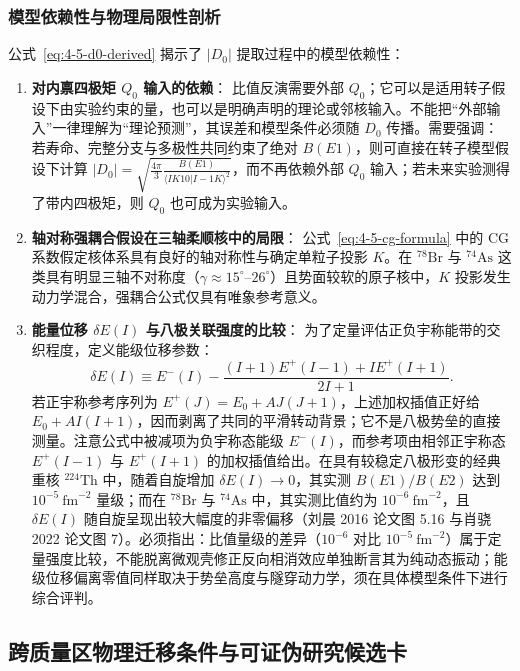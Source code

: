 \subsubsection{模型依赖性与物理局限性剖析}

公式~\eqref{eq:4-5-d0-derived} 揭示了 $|D_0|$ 提取过程中的模型依赖性：
\begin{enumerate}
\item \textbf{对内禀四极矩 $Q_0$ 输入的依赖}：
比值反演需要外部 $Q_0$；它可以是适用转子假设下由实验约束的量，也可以是明确声明的理论或邻核输入。不能把“外部输入”一律理解为“理论预测”，其误差和模型条件必须随 $D_0$ 传播。需要强调：若寿命、完整分支与多极性共同约束了绝对 $B(E1)$，则可直接在转子模型假设下计算 $|D_0| = \sqrt{\frac{4\pi}{3} \frac{B(E1)}{\langle I K 1 0 | I-1 K \rangle^2}}$，而不再依赖外部 $Q_0$ 输入；若未来实验测得了带内四极矩，则 $Q_0$ 也可成为实验输入。
\item \textbf{轴对称强耦合假设在三轴柔顺核中的局限}：
公式~\eqref{eq:4-5-cg-formula} 中的 CG 系数假定核体系具有良好的轴对称性与确定单粒子投影 $K$。在 $^{78}\mathrm{Br}$ 与 $^{74}\mathrm{As}$ 这类具有明显三轴不对称度（$\gamma \approx 15^\circ$--$26^\circ$）且势面较软的原子核中，$K$ 投影发生动力学混合，强耦合公式仅具有唯象参考意义。
\item \textbf{能量位移 $\delta E(I)$ 与八极关联强度的比较}：
为了定量评估正负宇称能带的交织程度，定义能级位移参数：
\begin{equation}\label{eq:4-5-delta-e-def}
\delta E(I) \equiv E^-(I) - \frac{(I+1) E^+(I-1) + I E^+(I+1)}{2I + 1}.
\end{equation}
若正宇称参考序列为 $E^+(J)=E_0+A J(J+1)$，上述加权插值正好给 $E_0+A I(I+1)$，因而剥离了共同的平滑转动背景；它不是八极势垒的直接测量。注意公式中被减项为负宇称态能级 $E^-(I)$，而参考项由相邻正宇称态 $E^+(I-1)$ 与 $E^+(I+1)$ 的加权插值给出。在具有较稳定八极形变的经典重核 $^{224}\mathrm{Th}$ 中，随着自旋增加 $\delta E(I) \to 0$，其实测 $B(E1)/B(E2)$ 达到 $10^{-5}\ \mathrm{fm}^{-2}$ 量级；而在 $^{78}\mathrm{Br}$ 与 $^{74}\mathrm{As}$ 中，其实测比值约为 $10^{-6}\ \mathrm{fm}^{-2}$，且 $\delta E(I)$ 随自旋呈现出较大幅度的非零偏移（刘晨 2016 论文图 5.16 与肖骁 2022 论文图 7）。必须指出：比值量级的差异（$10^{-6}$ 对比 $10^{-5}\ \mathrm{fm}^{-2}$）属于定量强度比较，不能脱离微观壳修正反向相消效应单独断言其为纯动态振动；能级位移偏离零值同样取决于势垒高度与隧穿动力学，须在具体模型条件下进行综合评判。
\end{enumerate}

\subsection{跨质量区物理迁移条件与可证伪研究候选卡}\label{sec:4-5-6}


